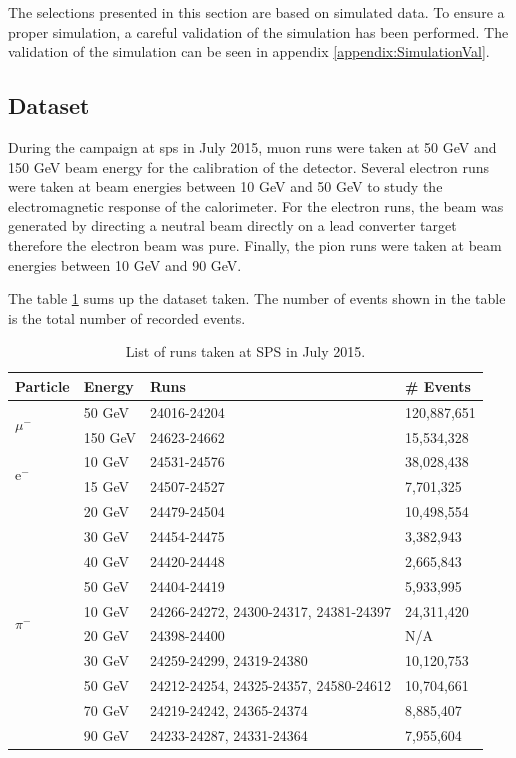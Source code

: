 The selections presented in this section are based on simulated data. To ensure a proper simulation, a careful validation of the simulation has been performed. The validation of the simulation can be seen in appendix \ref{appendix:SimulationVal}.

\subsection{Dataset}
\label{subsec:dataset}

During the campaign at \acrshort{sps} in July 2015, muon runs were taken at 50 GeV and 150 GeV beam energy for the calibration of the detector. Several electron runs were taken at beam energies between 10 GeV and 50 GeV to study the electromagnetic response of the calorimeter. For the electron runs, the beam was generated by directing a neutral beam directly on a lead converter target therefore the electron beam was pure. Finally, the pion runs were taken at beam energies between 10 GeV and 90 GeV.

The table \ref{table:dataruns} sums up the dataset taken. The number of events shown in the table is the total number of recorded events.

\begin{table}[htb!]
	\centering
	\caption{List of runs taken at SPS in July 2015.}
	\label{table:dataruns}
	\begin{tabular}{@{}lp{2cm}p{7.5cm}p{2cm}@{}}
		\toprule
		\multicolumn{1}{l}{\textbf{Particle}} & \textbf{Energy} & \textbf{Runs} & \textbf{\# Events}\\
		\midrule
		\multirow{2}{*}{$\mu^-$}& 50 GeV & 24016-24204 & 120,887,651\\& 150 GeV & 24623-24662 & 15,534,328\\
		\midrule
		\multirow{2}{*}{e$^-$}& 10 GeV & 24531-24576 & 38,028,438\\& 15 GeV & 24507-24527 & 7,701,325\\& 20 GeV & 24479-24504 & 10,498,554\\& 30 GeV & 24454-24475 & 3,382,943\\& 40 GeV & 24420-24448 & 2,665,843\\& 50 GeV & 24404-24419 & 5,933,995\\
		\midrule
		\multirow{2}{*}{$\pi^-$}& 10 GeV & 24266-24272, 24300-24317, 24381-24397 & 24,311,420\\& 20 GeV & 24398-24400 & N/A\\& 30 GeV & 24259-24299, 24319-24380 & 10,120,753\\& 50 GeV & 24212-24254, 24325-24357, 24580-24612 & 10,704,661\\& 70 GeV & 24219-24242, 24365-24374 & 8,885,407\\& 90 GeV & 24233-24287, 24331-24364 & 7,955,604\\
		\bottomrule
	\end{tabular}
\end{table}

